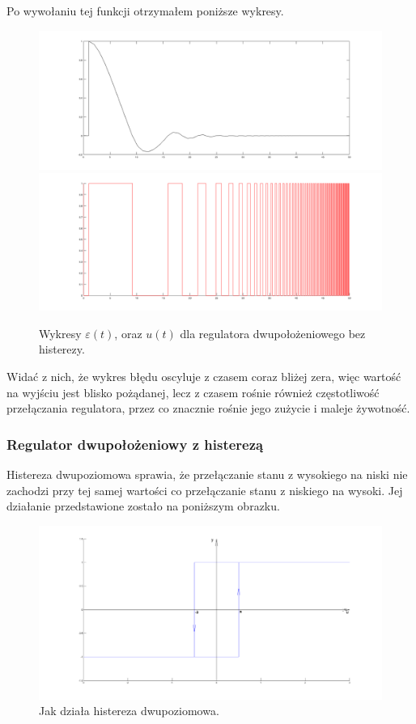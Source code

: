 \documentclass[a4paper,10pt]{article}
\begin{document}
Po wywołaniu tej funkcji otrzymałem poniższe wykresy.

\begin{figure}[!h]
    \centering
	\includegraphics[width=120mm]{dwu_bez_his_e.png}
	\includegraphics[width=120mm]{dwu_bez_his_u.png}
	\caption{Wykresy $\varepsilon(t)$, oraz $u(t)$ dla regulatora dwupołożeniowego bez histerezy.}
    \label{fig:Rysunek}
\end{figure}

\newpage Widać z nich, że wykres błędu oscyluje z czasem coraz bliżej zera, więc wartość na wyjściu jest blisko pożądanej, lecz z czasem rośnie również częstotliwość przełączania regulatora, przez co znacznie rośnie jego zużycie i maleje żywotność.

\subsubsection{Regulator dwupołożeniowy z histerezą}\label{sec:r2h}

Histereza dwupoziomowa sprawia, że przełączanie stanu z wysokiego na niski nie zachodzi przy tej samej wartości co przełączanie stanu z niskiego na wysoki. Jej działanie przedstawione zostało na poniższym obrazku.

\begin{figure}[!h]
    \centering
	\includegraphics[width=120mm]{CW3-histereza-dwupoziomowa.png}
	\caption{Jak działa histereza dwupoziomowa.}
    \label{fig:Rysunek}
\end{figure}
\end{document}
